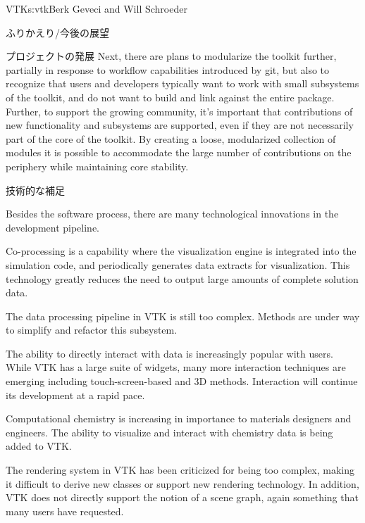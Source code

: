 \begin{aosachapter}{VTK}{s:vtk}{Berk Geveci and Will Schroeder}
\begin{aosasect1}{ふりかえり/今後の展望}
\begin{aosasect2}{プロジェクトの発展}
Next, there are plans to modularize the toolkit further, partially in
response to workflow capabilities introduced by git, but also to
recognize that users and developers typically want to work with small
subsystems of the toolkit, and do not want to build and link against
the entire package. Further, to support the growing community, it's
important that contributions of new functionality and subsystems are
supported, even if they are not necessarily part of the core of the
toolkit. By creating a loose, modularized collection of modules it is
possible to accommodate the large number of contributions on the
periphery while maintaining core stability.

\end{aosasect2}

\begin{aosasect2}{技術的な補足}

Besides the software process, there are many technological innovations
in the development pipeline.

\begin{aosaitemize}

  \item Co-processing is a capability where the visualization engine is
  integrated into the simulation code, and periodically generates data
  extracts for visualization. This technology greatly reduces the need
  to output large amounts of complete solution data.

  \item The data processing pipeline in VTK is still too
  complex. Methods are under way to simplify and refactor this
  subsystem.

  \item The ability to directly interact with data is increasingly
  popular with users. While VTK has a large suite of widgets, many
  more interaction techniques are emerging including
  touch-screen-based and 3D methods. Interaction will continue its
  development at a rapid pace.

  \item Computational chemistry is increasing in importance to materials
  designers and engineers. The ability to visualize and interact with
  chemistry data is being added to VTK.

  \item The rendering system in VTK has been criticized for being too
  complex, making it difficult to derive new classes or support new
  rendering technology. In addition, VTK does not directly support the
  notion of a scene graph, again something that many users have
  requested.


\end{aosaitemize}
\end{aosasect2}
\end{aosasect1}
\end{aosachapter}
